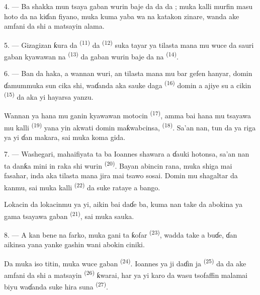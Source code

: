 \VUsaut{3.0mm}

4. --- Ba shakka mun tsaya gaban wurin baje  da
 da  da  ; muka kalli
murfin  masu hoto da na kiɗan fiyano, muka
kuma yaba wa  na katakon zinare, wanda ake
amfani da shi a matsayin alama.

5. --- Gizagizan ƙura da  \textsuperscript{(11)} da
 \textsuperscript{(12)} suka tayar ya tilasta mana
mu wuce da sauri gaban kyawawan  na  \textsuperscript{(13)} da gaban wurin baje 
da  na  \textsuperscript{(14)}.

6. --- Ban da haka, a wannan wuri, an tilasta mana mu bar gefen
hanyar, domin ɗamummuka sun cika shi, waɗanda aka sauke daga
 \textsuperscript{(16)} domin a ajiye su a cikin
 \textsuperscript{(15)} da aka yi hayarsa yanzu.

Wannan ya hana mu ganin kyawawan motocin 
\textsuperscript{(17)}, amma bai hana mu tsayawa mu kalli  \textsuperscript{(19)} yana yin akwati domin maƙwabcinsa,
 \textsuperscript{(18)}. Sa’an nan,
tun da ya riga ya yi ɗan makara, sai muka koma gida.

\VUsaut{3.0mm}

7. --- Washegari, mahaifiyata ta ba Ioannes shawara a ɗauki hotonsa,
sa’an nan ta danƙa mini in raka shi wurin 
\textsuperscript{(20)}. Bayan abincin rana, muka shiga  mai fasahar, inda aka tilasta mana jira mai tsawo sosai. Domin
mu shagaltar da kanmu, sai muka kalli 
\textsuperscript{(22)} da suke rataye a bango.

Lokacin da lokacinmu ya yi, aikin bai daɗe ba, kuma nan take da
abokina ya gama tsayawa gaban  \textsuperscript{(21)}, sai
muka sauka.

8. --- A kan bene na farko, muka gani ta ƙofar  \textsuperscript{(23)}, wadda take a buɗe, ɗan aikinsa yana yanke
gashin wani abokin ciniki.

Da muka iso titin, muka wuce gaban 
\textsuperscript{(24)}. Ioannes ya ji daɗin  ja
\textsuperscript{(25)} da  da ake amfani da
shi a matsayin  \textsuperscript{(26)} ƙwarai, har ya yi
karo da wasu tsofaffin malamai biyu waɗanda suke hira suna  \textsuperscript{(27)}.

